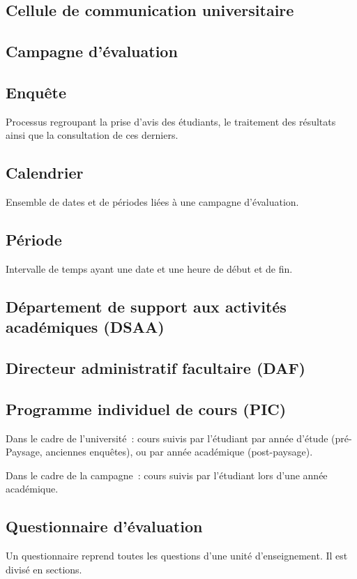 \documentclass[a4paper,11pt]{report}
\begin{document}
\subsection{Cellule de communication universitaire}

\subsection{Campagne d'évaluation}


\subsection{Enquête}
Processus regroupant la prise d'avis des étudiants, le traitement des résultats ainsi que la consultation de ces derniers.

\subsection{Calendrier}
Ensemble de dates et de périodes liées à une campagne d'évaluation.

\subsection{Période}
Intervalle de temps ayant une date et une heure de début et de fin.

\subsection{Département de support aux activités académiques (DSAA)}

\subsection{Directeur administratif facultaire (DAF)}

\subsection{Programme individuel de cours (PIC)}
Dans le cadre de l'université~: cours suivis par l'étudiant par année d'étude (pré-Paysage, anciennes enquêtes), ou par année académique (post-paysage).

Dans le cadre de la campagne~: cours suivis par l'étudiant lors d'une année académique.

\subsection{Questionnaire d'évaluation}
Un questionnaire reprend toutes les questions d'une unité d'enseignement.
Il est divisé en sections.
\end{document}
